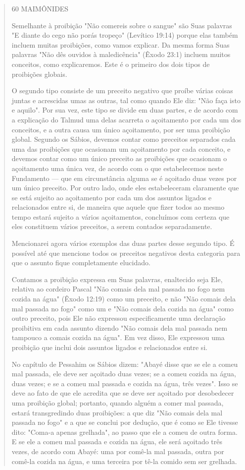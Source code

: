 \begin{quote}
60 MAIMÔNIDES

Semelhante à proibição "Não comereis sobre o sangue" são Suas pa­lavras
"E diante do cego não porás tropeço" (Levítico 19:14) porque elas
tam­bém incluem muitas proibições, como vamos explicar. Da mesma forma
Suas palavras "Não dês ouvidos à maledicência" (Êxodo 23:1) incluem
muitos con­ceitos, como explicaremos. Este é o primeiro dos dois tipos
de proibições globais.

O segundo tipo consiste de um preceito negativo que proíbe várias coisas
juntas e acrescidas umas as outras, tal como quando Ele diz: "Não faça
isto e aquilo". Por sua vez, este tipo se divide em duas partes, e de
acordo com a explicação do Talmud uma delas acarreta o açoitamento por
cada um dos con­ceitos, e a outra causa um único açoitamento, por ser
uma proibição global. Segundo os Sábios, devemos contar como preceitos
separados cada uma das proibições que ocasionam um açoitamento por cada
conceito, e devemos con­tar como um único preceito as proibições que
ocasionam o açoitamento uma única vez, de acordo com o que estabelecemos
neste Fundamento --- que em circunstância alguma se é açoitado duas
vezes por um único preceito. Por ou­tro lado, onde eles estabeleceram
claramente que se está sujeito ao açoitamen­to por cada um dos assuntos
ligados e relacionados entre si, de maneira que aquele que fizer todos
ao mesmo tempo estará sujeito a vários açoitamentos, concluímos com
certeza que eles constituem vários preceitos, a serem conta­dos
separadamente.

Mencionarei agora vários exemplos das duas partes desse segundo tipo. É
possível até que mencione todos os preceitos negativos desta categoria
para que o assunto fique completamente elucidado.

Contamos a proibição expressa em Suas palavras, enaltecido seja Ele,
relativa ao cordeiro Pascal "Não comais dela mal passada no fogo nem
cozida na água" (Êxodo 12:19) como um preceito, e não "Não comais dela
mal passa­da no fogo" como um e "Não comais dela cozida na água" como
outro precei­to, pois Ele não expressou especificamente uma declaração
proibitiva em cada assunto dizendo "Não comais dela mal passada nem
tampouco a comais cozida na água". Em vez disso, Ele expressou uma
proibição que inclui dois assuntos ligados e relacionados entre si.

No capítulo de Pessahim os Sábios dizem: "Abayé disse que se ele a comeu
mal passada, ele deve ser açoitado duas vezes; se a comeu cozida na
água, duas vezes; e se a comeu mal passada e cozida na água, três
vezes". Isso se deve ao fato de que ele acredita que se deve ser
açoitado por desobedecer uma proibição global; portanto, quando alguém a
comer mal passada, estará transgredindo duas proibições: a que diz "Não
comais dela mal passada no fo­go" e a que se conclui por dedução, que é
como se Ele tivesse dito: "Coma-a apenas grelhada", ao passo que ele a
comeu de outra forma. E se ele a comeu mal passada e cozida na água, ele
será açoitado três vezes, de acordo com Aba­yé: uma por comê-la mal
passada, outra por comê-la cozida na água, e uma ter­ceira por tê-la
comido sem ser grelhada.


\end{quote}

